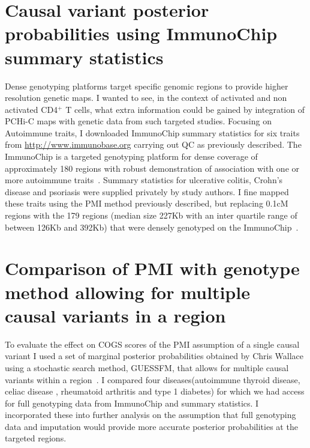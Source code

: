 \documentclass[a4paper,11pt]{report}
\begin{document}
\section{Causal variant posterior probabilities  using ImmunoChip summary statistics}
Dense genotyping platforms target specific genomic regions to provide higher resolution genetic maps. I wanted to see, in the context of activated and non activated CD4$^{+}$ T cells, what extra information could be gained by integration of PCHi-C maps with genetic data from such targeted studies.  Focusing on Autoimmune traits,  I downloaded  ImmunoChip summary statistics for six traits from \url{http://www.immunobase.org} carrying out QC as previously described. The ImmunoChip is a targeted genotyping platform for dense coverage of approximately 180 regions with robust demonstration of association with one or more autoimmune traits~\citep{CortesBrown2011}. Summary statistics for ulcerative colitis, Crohn's disease and psoriasis were supplied privately by study authors. I fine mapped these traits using the PMI method previously described, but replacing 0.1cM regions with the 179 regions (median size 227Kb with an inter quartile range of between 126Kb and 392Kb) that were densely genotyped on the ImmunoChip~\citep{Onengut-Gumuscu2015-lb}. 

\section{Comparison of PMI with genotype method allowing for multiple causal variants in a region}

To evaluate the effect on COGS scores of the PMI  assumption of a single causal variant I used a set of marginal posterior probabilities obtained by Chris Wallace using a stochastic search method, GUESSFM, that allows for multiple causal variants within a region~\citep{WallaceCutlerPontikosEtAl2015}. I compared  four diseases(autoimmune thyroid disease, celiac disease , rheumatoid arthritis and type 1 diabetes)   for which we had access for full genotyping data from ImmunoChip and summary statistics. I incorporated these into further analysis on the assumption that full genotyping data and imputation would provide more accurate posterior probabilities at the targeted regions.
\end{document}
